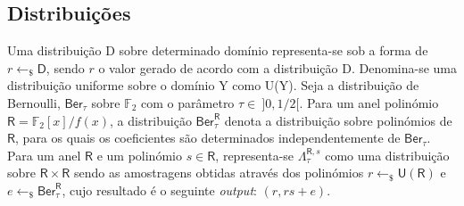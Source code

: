 \subsection{Distribuições}
Uma distribuição \textsf{D} sobre determinado domínio representa-se sob a forma de $r \longleftarrow_{\$} \mathsf{D}$, sendo $r$ o valor gerado de acordo com a distribuição \textsf{D}. Denomina-se uma distribuição uniforme sobre o domínio \textsf{Y} como \textsf{U(Y)}. Seja a distribuição de \textsf{Bernoulli},  $\textsf{Ber}_{\tau}$ sobre $\mathbb{F}_2$ com o parâmetro $\tau \in\ ]0,1/2[$. Para um anel polinómio $\mathsf{R} = \mathbb{F}_2[x]/f(x)$, a distribuição $\textsf{Ber}_{\tau}^\mathsf{R}$ denota a distribuição sobre polinómios de $\mathsf{R}$, para os quais os coeficientes são determinados independentemente de $\textsf{Ber}_{\tau}$. Para um anel $\mathsf{R}$ e um polinómio $s \in \mathsf{R}$, representa-se $\Lambda_{\tau}^{\mathsf{R},s}$ como uma distribuição sobre $\mathsf{R} \times \mathsf{R}$ sendo as amostragens obtidas através dos polinómios $r \longleftarrow_{\$} \mathsf{U(R)}$ e $e \longleftarrow_{\$} \mathsf{Ber}_{\tau}^\mathsf{R}$, cujo resultado é o seguinte \textit{output}: $(r, rs+e)$.
